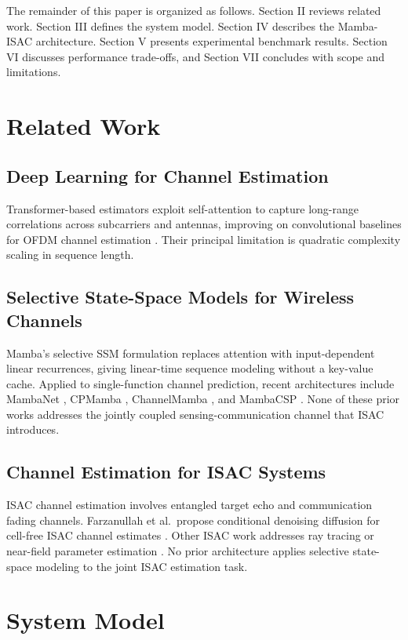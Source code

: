 \documentclass[conference]{IEEEtran}
\begin{document}
The remainder of this paper is organized as follows. Section II reviews related work. Section III defines the system model. Section IV describes the Mamba-ISAC architecture. Section V presents experimental benchmark results. Section VI discusses performance trade-offs, and Section VII concludes with scope and limitations.

\section{Related Work}

\subsection{Deep Learning for Channel Estimation}
Transformer-based estimators exploit self-attention to capture long-range correlations across subcarriers and antennas, improving on convolutional baselines for OFDM channel estimation \cite{xu_transformer_csi, bi_conv_transformer}. Their principal limitation is quadratic complexity scaling in sequence length.

\subsection{Selective State-Space Models for Wireless Channels}
Mamba's selective SSM formulation \cite{gu_mamba} replaces attention with input-dependent linear recurrences, giving linear-time sequence modeling without a key-value cache. Applied to single-function channel prediction, recent architectures include MambaNet \cite{mambanet}, CPMamba \cite{cpmamba}, ChannelMamba \cite{channelmamba}, and MambaCSP \cite{mambacsp}. None of these prior works addresses the jointly coupled sensing-communication channel that ISAC introduces.

\subsection{Channel Estimation for ISAC Systems}
ISAC channel estimation involves entangled target echo and communication fading channels. Farzanullah et al.\ propose conditional denoising diffusion for cell-free ISAC channel estimates \cite{farzanullah_isac_diffusion}. Other ISAC work addresses ray tracing \cite{bazzi_isac_imaging} or near-field parameter estimation \cite{isac_tensor_nearfield}. No prior architecture applies selective state-space modeling to the joint ISAC estimation task.

\section{System Model}
\end{document}

